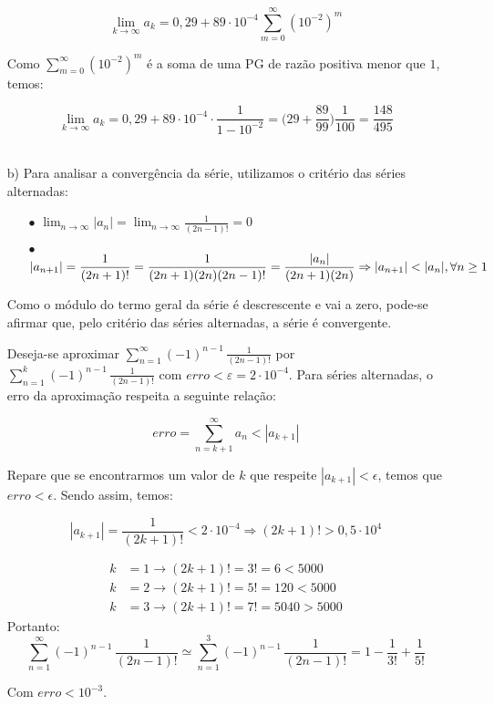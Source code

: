 \documentclass[12pt,a4paper]{article}
\begin{document}
\begin{itemize}
    $$ \lim_{k \rightarrow \infty} a_k = 0,29 + 89 \cdot 10^{-4} \sum_{m=0}^{\infty} (10^{-2})^m $$
    
    Como $\displaystyle\sum_{m=0}^{\infty} (10^{-2})^m$ é a soma de uma PG de razão positiva menor que $1$, temos:
    
    $$ \lim_{k \rightarrow \infty} a_k = 0,29 + 89 \cdot 10^{-4} \cdot \frac{1}{1 - 10^{-2}} = \Big(29 + \frac{89}{99} \Big) \frac{1}{100} = \frac{148}{495} $$ \\



    \item[b)] Para analisar a convergência da série, utilizamos o critério das séries alternadas:
    
    \begin{itemize}
    \item[$\bullet$] $\displaystyle\lim_{n \rightarrow \infty} |a_n| = \lim_{n \rightarrow \infty} \displaystyle\frac{1}{(2n-1)!} = 0 $
    \item[$\bullet$] $|a_{n+1}| = \displaystyle\frac{1}{(2n+1)!} = \displaystyle\frac{1}{(2n+1)(2n)(2n-1)!} = \frac{|a_n|}{(2n+1)(2n)} \\ \Rightarrow |a_{n+1}| < |a_n|, \forall n \geq 1  $
    \end{itemize}
    
    Como o módulo do termo geral da série é descrescente e vai a zero, pode-se afirmar que, pelo critério das séries alternadas, a série é convergente.
    
    Deseja-se aproximar $\displaystyle\sum_{n=1}^\infty (-1)^{n-1} \, \frac{1}{(2n-1)!}$ por $\displaystyle\sum_{n=1}^k (-1)^{n-1} \, \frac{1}{(2n-1)!}$  com $erro < \varepsilon = 2 \cdot 10^{-4}$.
Para séries alternadas, o erro da aproximação respeita a seguinte relação:

$$ erro = \sum_{n=k+1}^\infty a_n < |a_{k+1}| $$

Repare que se encontrarmos um valor de $k$ que respeite $|a_{k+1}| < \epsilon$, temos que $erro < \epsilon$. Sendo assim, temos:

$$|a_{k+1}| = \frac{1}{(2k+1)!} < 2 \cdot 10^{-4} \Rightarrow (2k+1)! > 0,5 \cdot 10^{4} $$

\begin{align*} 
    k &= 1 \rightarrow (2k+1)! = 3! = 6 < 5000 \\ 
    k &= 2 \rightarrow (2k+1)! = 5! = 120 < 5000 \\ 
    k &= 3 \rightarrow (2k+1)! = 7! = 5040 > 5000
\end{align*}
Portanto: 
$$ \sum_{n=1}^\infty (-1)^{n-1} \, \frac{1}{(2n-1)!}  \simeq \sum_{n=1}^3 (-1)^{n-1} \, \frac{1}{(2n-1)!} = 1 - \frac{1}{3!} + \frac{1}{5!}  $$

Com $erro < 10^{-3}$.
\end{itemize}
\newpage
\end{document}
